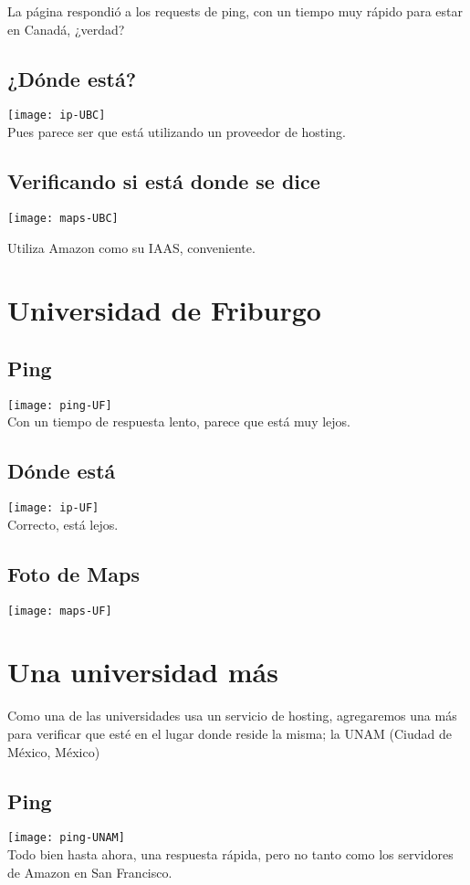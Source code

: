 La página respondió a los requests de ping, con un tiempo muy rápido para estar en Canadá, ¿verdad?

\subsection{¿Dónde está?}
\texttt{[image: ip-UBC]}\\
Pues parece ser que está utilizando un proveedor de hosting.\\
\subsection{Verificando si está donde se dice}
\texttt{[image: maps-UBC]}

Utiliza Amazon como su IAAS, conveniente.

\section{Universidad de Friburgo}
	\subsection{Ping}
	\texttt{[image: ping-UF]}\\
	Con un tiempo de respuesta lento, parece
	que está muy lejos.
	\subsection{Dónde está}
	\texttt{[image: ip-UF]}\\
	Correcto, está lejos.
	\subsection{Foto de Maps}
	\texttt{[image: maps-UF]}	
	
\section{Una universidad más}
Como una de las universidades usa un servicio
de hosting, agregaremos una más para verificar
que esté en el lugar donde reside la misma;
la UNAM (Ciudad de México, México)
\subsection{Ping}
\texttt{[image: ping-UNAM]}\\
Todo bien hasta ahora, una respuesta rápida, pero no tanto como los servidores de Amazon en San Francisco.

